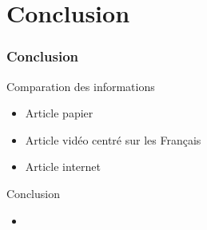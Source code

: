 \section{Conclusion}
\begin{frame}
\frametitle{Conclusion}
  \begin{block}{Comparation des informations}
    \begin{itemize}
      \item{Article papier }
      \item{Article vidéo centré sur les Français}
      \item{Article internet }
    \end{itemize} 
  \end{block} \pause
  
  \begin{block}{Conclusion}
    \begin{itemize}
      \item{}
    \end{itemize}
  \end{block}
\end{frame}
